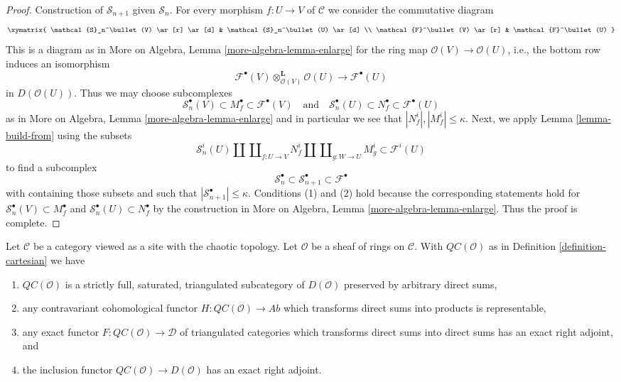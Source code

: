 \begin{proof}
\medskip\noindent
Construction of $\mathcal{S}_{n + 1}$ given $\mathcal{S}_n$.
For every morphism $f : U \to V$ of $\mathcal{C}$
we consider the commutative diagram
$$
\xymatrix{
\mathcal{S}_n^\bullet(V)
\ar[r] \ar[d] &
\mathcal{S}_n^\bullet(U) \ar[d] \\
\mathcal{F}^\bullet(V)
\ar[r] &
\mathcal{F}^\bullet(U)
}
$$
This is a diagram as in More on Algebra, Lemma \ref{more-algebra-lemma-enlarge}
for the ring map $\mathcal{O}(V) \to \mathcal{O}(U)$, i.e., the bottom row
induces an isomorphism
$$
\mathcal{F}^\bullet(V) \otimes_{\mathcal{O}(V)}^\mathbf{L} \mathcal{O}(U)
\longrightarrow
\mathcal{F}^\bullet(U)
$$
in $D(\mathcal{O}(U))$. Thus we may choose subcomplexes
$$
\mathcal{S}_n^\bullet(V) \subset M^\bullet_f \subset \mathcal{F}^\bullet(V)
\quad\text{and}\quad
\mathcal{S}_n^\bullet(U) \subset N^\bullet_f \subset \mathcal{F}^\bullet(U)
$$
as in More on Algebra, Lemma \ref{more-algebra-lemma-enlarge}
and in particular we see that $|N^i_f|, |M^i_f| \leq \kappa$. Next, we apply
Lemma \ref{lemma-build-from} using the subsets
$$
\mathcal{S}_n^i(U) \amalg \coprod\nolimits_{f : U \to V} N^i_f
\amalg \coprod\nolimits_{g : W \to U} M^i_g
\subset
\mathcal{F}^i(U)
$$
to find a subcomplex
$$
\mathcal{S}_n^\bullet \subset
\mathcal{S}_{n + 1}^\bullet \subset
\mathcal{F}^\bullet
$$
with containing those subsets and such that
$|\mathcal{S}_{n + 1}^\bullet| \leq \kappa$.
Conditions (1) and (2) hold because the corresponding statements
hold for 
$\mathcal{S}_n^\bullet(V) \subset M^\bullet_f$ and
$\mathcal{S}_n^\bullet(U) \subset N^\bullet_f$ by the construction in
More on Algebra, Lemma \ref{more-algebra-lemma-enlarge}.
Thus the proof is complete.
\end{proof}

\begin{proposition}
\label{proposition-cartesian-brown}
Let $\mathcal{C}$ be a category viewed as a site with
the chaotic topology. Let $\mathcal{O}$ be a sheaf of rings on $\mathcal{C}$.
With $\mathit{QC}(\mathcal{O})$ as in
Definition \ref{definition-cartesian} we have
\begin{enumerate}
\item $\mathit{QC}(\mathcal{O})$ is a strictly full, saturated, triangulated
subcategory of $D(\mathcal{O})$ preserved by arbitrary direct sums,
\item any contravariant cohomological functor
$H : \mathit{QC}(\mathcal{O}) \to \textit{Ab}$
which transforms direct sums into products is representable,
\item any exact functor $F : \mathit{QC}(\mathcal{O}) \to \mathcal{D}$
of triangulated categories which transforms direct sums into direct sums
has an exact right adjoint, and
\item the inclusion functor $\mathit{QC}(\mathcal{O}) \to D(\mathcal{O})$ has
an exact right adjoint.
\end{enumerate}
\end{proposition}


